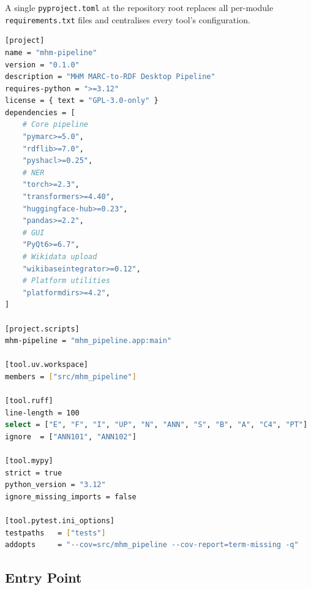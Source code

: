 \documentclass[12pt]{article}
\newcommand{\code}[1]{\texttt{#1}}
\begin{document}
A single \code{pyproject.toml} at the repository root replaces all per-module \code{requirements.txt} files and centralises every tool's configuration.

\begin{lstlisting}[language=bash, caption={pyproject.toml --- abridged}]
[project]
name = "mhm-pipeline"
version = "0.1.0"
description = "MHM MARC-to-RDF Desktop Pipeline"
requires-python = ">=3.12"
license = { text = "GPL-3.0-only" }
dependencies = [
    # Core pipeline
    "pymarc>=5.0",
    "rdflib>=7.0",
    "pyshacl>=0.25",
    # NER
    "torch>=2.3",
    "transformers>=4.40",
    "huggingface-hub>=0.23",
    "pandas>=2.2",
    # GUI
    "PyQt6>=6.7",
    # Wikidata upload
    "wikibaseintegrator>=0.12",
    # Platform utilities
    "platformdirs>=4.2",
]

[project.scripts]
mhm-pipeline = "mhm_pipeline.app:main"

[tool.uv.workspace]
members = ["src/mhm_pipeline"]

[tool.ruff]
line-length = 100
select = ["E", "F", "I", "UP", "N", "ANN", "S", "B", "A", "C4", "PT"]
ignore  = ["ANN101", "ANN102"]

[tool.mypy]
strict = true
python_version = "3.12"
ignore_missing_imports = false

[tool.pytest.ini_options]
testpaths   = ["tests"]
addopts     = "--cov=src/mhm_pipeline --cov-report=term-missing -q"
\end{lstlisting}

\subsection{Entry Point}
\end{document}
